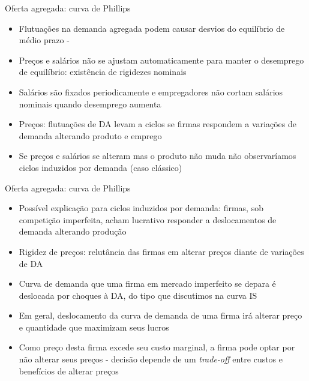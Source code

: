 \documentclass[10pt]{beamer}
\begin{document}
\begin{frame}
    {Oferta agregada: curva de Phillips}
    \begin{itemize}
        \item Flutuações na demanda agregada podem causar desvios do equilíbrio de médio prazo - \bigskip
        \item Preços e salários não se ajustam automaticamente para manter o desemprego de equilíbrio: existência de rigidezes nominais\bigskip
        \item Salários são fixados periodicamente e empregadores não cortam salários nominais quando desemprego aumenta\bigskip
        \item Preços: flutuações de DA levam a ciclos se firmas respondem a variações de demanda alterando produto e emprego\bigskip
        \item Se preços e salários se alteram mas o produto não muda não observaríamos ciclos induzidos por demanda (caso clássico)
    \end{itemize}
\end{frame}

\begin{frame}
    {Oferta agregada: curva de Phillips}
    \begin{itemize}
        \item Possível explicação para ciclos induzidos por demanda: firmas, sob competição imperfeita, acham lucrativo responder a deslocamentos de demanda alterando produção\bigskip
        \item Rigidez de preços: relutância das firmas em alterar preços diante de variações de DA\bigskip
        \item Curva de demanda que uma firma em mercado imperfeito se depara é deslocada por choques à DA, do tipo que discutimos na curva IS\bigskip
        \item Em geral, deslocamento da curva de demanda de uma firma irá alterar preço e quantidade que maximizam seus lucros\bigskip
        \item Como preço desta firma excede seu custo marginal, a firma pode optar por não alterar seus preços - decisão depende de um \emph{trade-off} entre custos e benefícios de alterar preços
    \end{itemize}
\end{frame}
\end{document}
